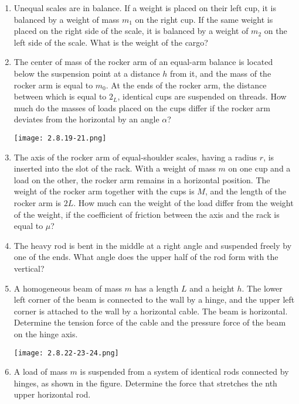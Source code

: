 \documentclass{article}
\begin{document}
\begin{enumerate}[label=2.8.\arabic*]
\item Unequal scales are in balance. If a weight is placed on their left cup, it is balanced by a weight of mass $m_1$ on the right cup. If the same weight is placed on the right side of the scale, it is balanced by a weight of $m_2$ on the left side of the scale. What is the weight of the cargo?

\item The center of mass of the rocker arm of an equal-arm balance is located below the suspension point at a distance $h$ from it, and the mass of the rocker arm is equal to $m_0$. At the ends of the rocker arm, the distance between which is equal to $2_L$, identical cups are suspended on threads. How much do the masses of loads placed on the cups differ if the rocker arm deviates from the horizontal by an angle $\alpha$?

\begin{center}
    \texttt{[image: 2.8.19-21.png]}
\end{center}

\item The axis of the rocker arm of equal-shoulder scales, having a radius $r$, is inserted into the slot of the rack. With a weight of mass $m$ on one cup and a load on the other, the rocker arm remains in a horizontal position. The weight of the rocker arm together with the cups is $M$, and the length of the rocker arm is $2L$. How much can the weight of the load differ from the weight of the weight, if the coefficient of friction between the axis and the rack is equal to $\mu$?

\item The heavy rod is bent in the middle at a right angle and suspended freely by one of the ends. What angle does the upper half of the rod form with the vertical?

\item A homogeneous beam of mass $m$ has a length $L$ and a height $h$. The lower left corner of the beam is connected to the wall by a hinge, and the upper left corner is attached to the wall by a horizontal cable. The beam is horizontal. Determine the tension force of the cable and the pressure force of the beam on the hinge axis.

\begin{center}
    \texttt{[image: 2.8.22-23-24.png]}
\end{center}

\item A load of mass $m$ is suspended from a system of identical rods connected by hinges, as shown in the figure. Determine the force that stretches the nth upper horizontal rod.


\end{enumerate}
\end{document}
